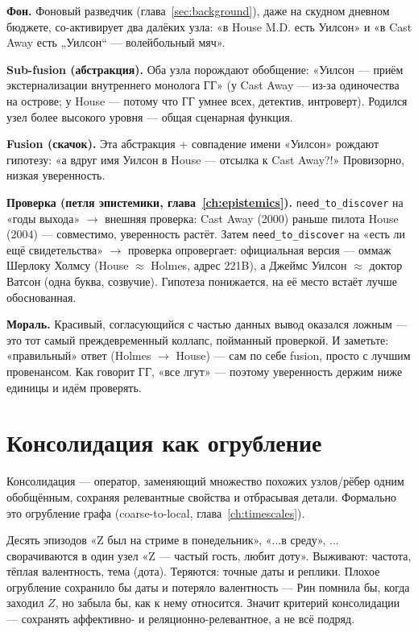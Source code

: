 \begin{workedbox}
\textbf{Фон.} Фоновый разведчик (глава~\ref{sec:background}), даже на скудном
дневном бюджете, со-активирует два далёких узла: «в House M.D. есть Уилсон» и
«в Cast Away есть „Уилсон“ --- волейбольный мяч».

\textbf{Sub-fusion (абстракция).} Оба узла порождают обобщение:
«Уилсон --- приём экстернализации внутреннего монолога ГГ» (у Cast Away --- из-за
одиночества на острове; у House --- потому что ГГ умнее всех, детектив,
интроверт). Родился узел более высокого уровня --- общая сценарная функция.

\textbf{Fusion (скачок).} Эта абстракция + совпадение имени «Уилсон» рождают
гипотезу: «а вдруг имя Уилсон в House --- отсылка к Cast Away?!» Провизорно,
низкая уверенность.

\textbf{Проверка (петля эпистемики, глава~\ref{ch:epistemics}).}
\texttt{need\_to\_discover} на «годы выхода» $\to$ внешняя проверка: Cast Away
(2000) раньше пилота House (2004) --- совместимо, уверенность растёт. Затем
\texttt{need\_to\_discover} на «есть ли ещё свидетельства» $\to$ проверка
опровергает: официальная версия --- оммаж Шерлоку Холмсу (House $\approx$
Holmes, адрес 221B), а Джеймс Уилсон $\approx$ доктор Ватсон (одна буква,
созвучие). Гипотеза понижается, на её место встаёт лучше обоснованная.

\textbf{Мораль.} Красивый, согласующийся с частью данных вывод оказался
ложным --- это тот самый преждевременный коллапс, пойманный проверкой. И
заметьте: «правильный» ответ (Holmes $\to$ House) --- сам по себе fusion,
просто с лучшим провенансом. Как говорит ГГ, «все лгут» --- поэтому
уверенность держим ниже единицы и идём проверять.
\end{workedbox}

\section{Консолидация как огрубление}

\begin{definition}
Консолидация --- оператор, заменяющий множество похожих узлов/рёбер одним
обобщённым, сохраняя релевантные свойства и отбрасывая детали. Формально это
огрубление графа (coarse-to-local, глава~\ref{ch:timescales}).
\end{definition}

\begin{workedbox}
Десять эпизодов «Z был на стриме в понедельник», «...в среду», ... сворачиваются
в один узел «Z --- частый гость, любит доту». Выживают: частота, тёплая
валентность, тема (дота). Теряются: точные даты и реплики. Плохое огрубление
сохранило бы даты и потеряло валентность --- Рин помнила бы, когда заходил $Z$,
но забыла бы, как к нему относится. Значит критерий консолидации --- сохранять
аффективно- и реляционно-релевантное, а не всё подряд.
\end{workedbox}

